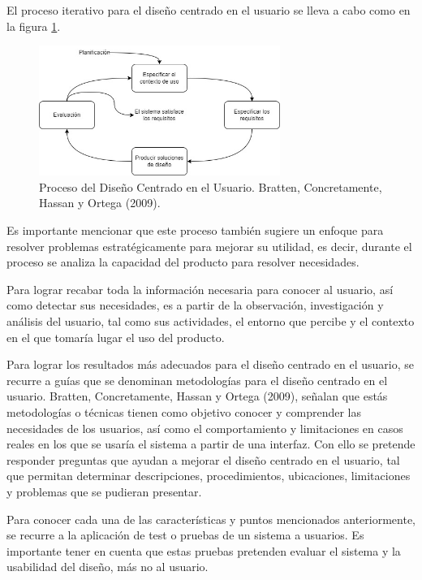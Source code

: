 El proceso iterativo para el diseño centrado en el usuario se lleva a cabo como en la figura \ref{fig:33}.

\begin{figure}
  \centering
  \includegraphics[width=0.70\textwidth]{Cap3/Figuras/DCU.jpg}
  \caption{Proceso del Diseño Centrado en el Usuario. Bratten, Concretamente, Hassan y Ortega (2009).}
  \label{fig:33}
\end{figure}

Es importante mencionar que este proceso también sugiere un enfoque para resolver problemas estratégicamente para mejorar su utilidad, es decir, durante el proceso se analiza la capacidad del producto para resolver necesidades.

Para lograr recabar toda la información necesaria para conocer al usuario, así como detectar sus necesidades, es a partir de la observación, investigación y análisis del usuario, tal como sus actividades, el entorno que percibe y el contexto en el que tomaría lugar el uso del producto.

Para lograr los resultados más adecuados para el diseño centrado en el usuario, se recurre a guías que se denominan metodologías para el diseño centrado en el usuario. Bratten, Concretamente, Hassan y Ortega (2009), señalan que estás metodologías o técnicas tienen como objetivo conocer y comprender las necesidades de los usuarios, así como el comportamiento y limitaciones en casos reales en los que se usaría el sistema a partir de una interfaz. Con ello se pretende responder preguntas que ayudan a mejorar el diseño centrado en el usuario, tal que permitan determinar descripciones, procedimientos, ubicaciones, limitaciones y problemas que se pudieran presentar.

Para conocer cada una de las características y puntos mencionados anteriormente, se recurre a la aplicación de test o pruebas de un sistema a usuarios. Es importante tener en cuenta que estas pruebas pretenden evaluar el sistema y la usabilidad del diseño, más no al usuario.

